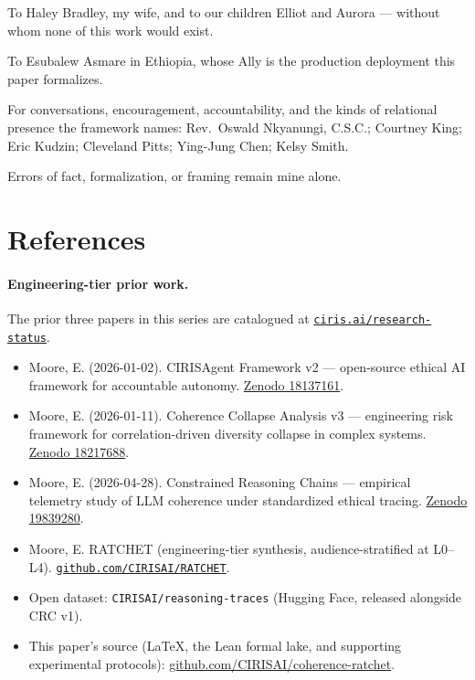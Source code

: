 \documentclass[11pt,a4paper]{article}
\begin{document}
To Haley Bradley, my wife, and to our children Elliot and Aurora --- without whom none of this work would exist.

To Esubalew Asmare in Ethiopia, whose Ally is the production deployment this paper formalizes.

For conversations, encouragement, accountability, and the kinds of relational presence the framework names: Rev.\ Oswald Nkyanungi, C.S.C.; Courtney King; Eric Kudzin; Cleveland Pitts; Ying-Jung Chen; Kelsy Smith.

Errors of fact, formalization, or framing remain mine alone.

\section{References}\label{sec:refs}

\paragraph{Engineering-tier prior work.} The prior three papers in this series are catalogued at \href{https://ciris.ai/research-status}{\texttt{ciris.ai/research-status}}.
\begin{itemize}[leftmargin=*,itemsep=2pt]
\item Moore, E. (2026-01-02). CIRISAgent Framework v2 --- open-source ethical AI framework for accountable autonomy. \href{https://zenodo.org/records/18137161}{Zenodo 18137161}.
\item Moore, E. (2026-01-11). Coherence Collapse Analysis v3 --- engineering risk framework for correlation-driven diversity collapse in complex systems. \href{https://zenodo.org/records/18217688}{Zenodo 18217688}.
\item Moore, E. (2026-04-28). Constrained Reasoning Chains --- empirical telemetry study of LLM coherence under standardized ethical tracing. \href{https://zenodo.org/records/19839280}{Zenodo 19839280}.
\item Moore, E. RATCHET (engineering-tier synthesis, audience-stratified at L0--L4). \href{https://github.com/CIRISAI/RATCHET}{\nolinkurl{github.com/CIRISAI/RATCHET}}.
\item Open dataset: \texttt{CIRISAI/reasoning-traces} (Hugging Face, released alongside CRC v1).
\item This paper's source (\LaTeX, the Lean formal lake, and supporting experimental protocols): \href{https://github.com/CIRISAI/coherence-ratchet}{github.com/CIRISAI/coherence-ratchet}.
\end{itemize}
\end{document}
